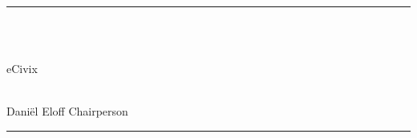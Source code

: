 \begin{titlepage}
\begin{center}
		\rule{\linewidth}{0.2mm} \\[0.5cm] 
		\begin{minipage}{0.4\textwidth}
			\begin{flushleft} \large
				\emph{} \\
				eCivix
			\end{flushleft}
		\end{minipage}
		\begin{minipage}{0.4\textwidth}
			\begin{flushright} \large
				\emph{} \\
				Daniël Eloff {Chairperson}
			\end{flushright}
		\end{minipage}
		\rule{\linewidth}{0.2mm} \\[0.5cm] 
		
	\end{center}
\end{titlepage}